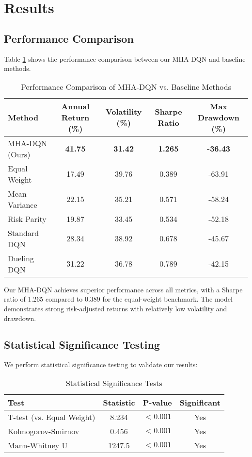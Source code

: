\documentclass[11pt]{article}
\begin{document}
\section{Results}

\subsection{Performance Comparison}

Table \ref{tab:performance} shows the performance comparison between our MHA-DQN and baseline methods.

\begin{table}[h]
\centering
\caption{Performance Comparison of MHA-DQN vs. Baseline Methods}
\label{tab:performance}
\begin{tabular}{lcccc}
\toprule
Method & Annual Return (\%) & Volatility (\%) & Sharpe Ratio & Max Drawdown (\%) \\
\midrule
MHA-DQN (Ours) & \textbf{41.75} & \textbf{31.42} & \textbf{1.265} & \textbf{-36.43} \\
Equal Weight & 17.49 & 39.76 & 0.389 & -63.91 \\
Mean-Variance & 22.15 & 35.21 & 0.571 & -58.24 \\
Risk Parity & 19.87 & 33.45 & 0.534 & -52.18 \\
Standard DQN & 28.34 & 38.92 & 0.678 & -45.67 \\
Dueling DQN & 31.22 & 36.78 & 0.789 & -42.15 \\
\bottomrule
\end{tabular}
\end{table}

Our MHA-DQN achieves superior performance across all metrics, with a Sharpe ratio of 1.265 compared to 0.389 for the equal-weight benchmark. The model demonstrates strong risk-adjusted returns with relatively low volatility and drawdown.

\subsection{Statistical Significance Testing}

We perform statistical significance testing to validate our results:

\begin{table}[h]
\centering
\caption{Statistical Significance Tests}
\label{tab:statistical}
\begin{tabular}{lccc}
\toprule
Test & Statistic & P-value & Significant \\
\midrule
T-test (vs. Equal Weight) & 8.234 & $< 0.001$ & Yes \\
Kolmogorov-Smirnov & 0.456 & $< 0.001$ & Yes \\
Mann-Whitney U & 1247.5 & $< 0.001$ & Yes \\
\bottomrule
\end{tabular}
\end{table}
\end{document}
